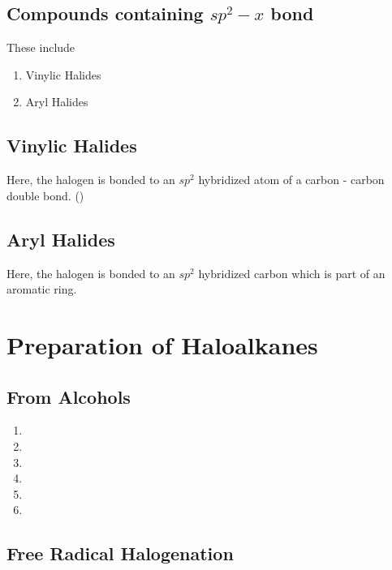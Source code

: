 \documentclass{article}
\begin{document}
\subsection{Compounds containing $sp^2-x$ bond}
These include
\begin{enumerate}
  \item Vinylic Halides
  \item{Aryl Halides}
\end{enumerate}
\subsection*{Vinylic Halides}
Here, the halogen is bonded to an $sp^2$ hybridized atom of a carbon - carbon
double bond. ()
\vspace{5mm}

 \qquad{} 
\subsection*{Aryl Halides}
Here, the halogen is bonded to an $sp^2$ hybridized carbon which
is part of an aromatic ring.
\vspace{5mm}


\section{Preparation of Haloalkanes}
\subsection{From Alcohols}
\begin{enumerate}
 \item {}
 \item {}
 \item {}
 \item {}
 \item {}
 \item {}
\end{enumerate}
\subsection{Free Radical Halogenation}
\vspace{5mm}
\end{document}
